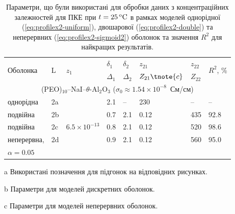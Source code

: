 \documentclass[14pt,twoside]{vakthesis}
\begin{document}
\begin{table}[!tb]
	\centering \caption{\label{tab:adjustable_params-12} Параметри, що були
		використані для обробки даних \cite{Przl1995,Wiec1994} з 
		концентраційних залежностей для ПКЕ при $t= 25\,\rm{^oC}$ в 
		рамках моделей однорідної (\ref{eq:profilex2-uniform}), двошарової (\ref{eq:profilex2-double})
		та неперервних (\ref{eq:profilex2-sigmoid2}) оболонок та значення $R^2$
		для найкращих результатів.}
	\begin{threeparttable}
		\begin{tabularx}{\textwidth}{|X|l|X|l|l|l|l|l|}
			\hline
			\multirow{2}{*}{Оболонка} &\multirow{2}{*}{L\tnote{a}} &   \multirow{2}{*}{${z}_1$} & $\delta_1$\tnote{b} & $\delta_2$\tnote{b} &  ${z}_{21}$\tnote{b} & ${z}_{22}$\tnote{b} &  \multirow{2}{*}{$R^2$, \%} \\
			&  & & $\Delta_1$\tnote{c}& $\Delta_2$\tnote{c}&${Z}_{21}\tnote{c}$&${Z}_{22}$\tnote{c}& \\
			\hline
			\multicolumn{8}{c}{(PEO)$_{10}$--NaI--$\theta$-Al$_2$O$_3$ ($\sigma_0 \approx 1.54\times 10^{-8}$~См/см)}\\
			\hline
			однорідна &2a & \multirow{5}{*}{$6.5\times 10^{-13}$} &2.1&--&230&--&--  \\
			подвійна &2b                                       &                   &0.7&2.1&0.12&435& 92.8\\
			подвійна &2c                                       &                   &0.8&2.1&0.12&520& 98.6\\
			неперервна, &2d                                  &                   &0.9&2.1&0.12&560& 95.0\\
			$\alpha =0.05$  &  & & & & & &   \\
			\hline
		\end{tabularx}
		\begin{tablenotes}
			\item[a] Використані позначення для підгонок на відповідних
			рисунках.
			\item[b] Параметри для моделей дискретних оболонок.
			\item[c] Параметри для моделей неперервних оболонок.
		\end{tablenotes}
	\end{threeparttable}
\end{table}
\end{document}
